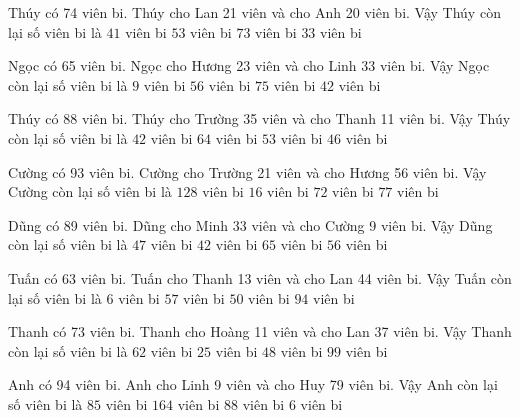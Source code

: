 \documentclass[12pt,a4paper]{article}
\begin{document}
\begin{ex}
Thúy có 74 viên bi. Thúy cho Lan 21 viên và cho Anh 20 viên bi. Vậy Thúy còn lại số viên bi là
 \choice 
{$41$ viên bi}
{$53$ viên bi}
{$73$ viên bi}
{\True $33$ viên bi}
\end{ex}
\begin{ex}
Ngọc có 65 viên bi. Ngọc cho Hương 23 viên và cho Linh 33 viên bi. Vậy Ngọc còn lại số viên bi là
 \choice 
{\True $9$ viên bi}
{$56$ viên bi}
{$75$ viên bi}
{$42$ viên bi}
\end{ex}
\begin{ex}
Thúy có 88 viên bi. Thúy cho Trường 35 viên và cho Thanh 11 viên bi. Vậy Thúy còn lại số viên bi là
 \choice 
{\True $42$ viên bi}
{$64$ viên bi}
{$53$ viên bi}
{$46$ viên bi}
\end{ex}
\begin{ex}
Cường có 93 viên bi. Cường cho Trường 21 viên và cho Hương 56 viên bi. Vậy Cường còn lại số viên bi là
 \choice 
{$128$ viên bi}
{\True $16$ viên bi}
{$72$ viên bi}
{$77$ viên bi}
\end{ex}
\begin{ex}
Dũng có 89 viên bi. Dũng cho Minh 33 viên và cho Cường 9 viên bi. Vậy Dũng còn lại số viên bi là
 \choice 
{\True $47$ viên bi}
{$42$ viên bi}
{$65$ viên bi}
{$56$ viên bi}
\end{ex}
\begin{ex}
Tuấn có 63 viên bi. Tuấn cho Thanh 13 viên và cho Lan 44 viên bi. Vậy Tuấn còn lại số viên bi là
 \choice 
{\True $6$ viên bi}
{$57$ viên bi}
{$50$ viên bi}
{$94$ viên bi}
\end{ex}
\begin{ex}
Thanh có 73 viên bi. Thanh cho Hoàng 11 viên và cho Lan 37 viên bi. Vậy Thanh còn lại số viên bi là
 \choice 
{$62$ viên bi}
{\True $25$ viên bi}
{$48$ viên bi}
{$99$ viên bi}
\end{ex}
\begin{ex}
Anh có 94 viên bi. Anh cho Linh 9 viên và cho Huy 79 viên bi. Vậy Anh còn lại số viên bi là
 \choice 
{$85$ viên bi}
{$164$ viên bi}
{$88$ viên bi}
{\True $6$ viên bi}
\end{ex}
\end{document}
